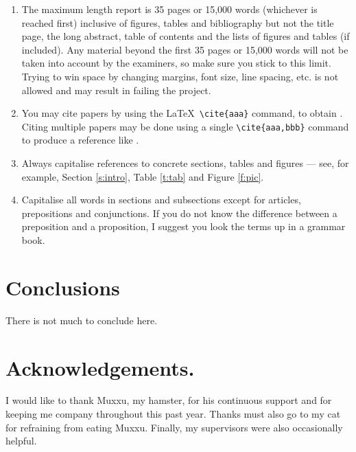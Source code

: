 \documentclass{csfyp}
\begin{document}
\begin{enumerate}
  \item The maximum length report is 35 pages or 15,000 words (whichever is reached first) inclusive of figures, tables and bibliography but not the title page, the long abstract, table of contents and the lists of figures and tables (if included). Any material beyond the first 35 pages or 15,000 words will not be taken into account by the examiners, so make sure you stick to this limit. Trying to win space by changing margins, font size, line spacing, etc. is not allowed and may result in failing the project. 

\item You may cite papers by using the \LaTeX\ \verb+\cite{aaa}+ command, to obtain \cite{paper1}. Citing multiple papers may be done using a single \verb+\cite{aaa,bbb}+ command to produce a reference like \cite{paper1, paper2}.

\item Always capitalise references to concrete sections, tables and figures --- see, for example, Section \ref{s:intro}, Table \ref{t:tab} and Figure \ref{f:pic}.

\item Capitalise all words in sections and subsections except for articles, prepositions and conjunctions. If you do not know the difference between a preposition and a proposition, I suggest you look the terms up in a grammar book.

\end{enumerate}


\section{Conclusions}

There is not much to conclude here.

\section*{Acknowledgements.}
I would like to thank Muxxu, my hamster, for his continuous support and for keeping me company throughout this past year. Thanks must also go to my cat for refraining from eating Muxxu. Finally, my supervisors were also occasionally helpful.



\end{document}
